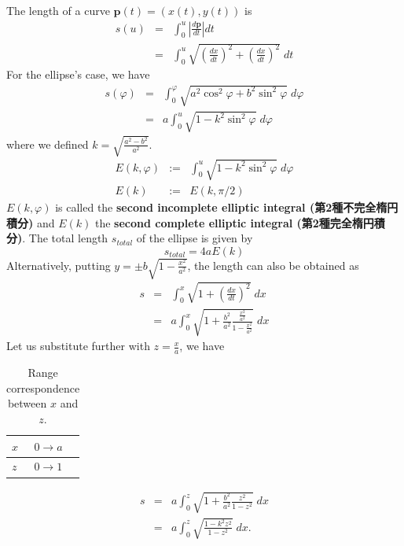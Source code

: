 \documentclass{article}
\begin{document}
The length of a curve $\mathbf{p}(t) = (x(t), y(t))$ is
\begin{eqnarray}
s(u) &=& \int_{0}^{u} \left| \frac{d \mathbf{p}}{d t} \right| dt  \\ \nonumber
     &=& \int_{0}^{u} \sqrt{ \left( \frac{d x}{d t} \right)^{2} +  \left( \frac{d x}{d t} \right)^{2} } \; dt
\end{eqnarray}
For the ellipse's case, we have
\begin{eqnarray}
s(\varphi) &=& \int_{0}^{\varphi} \sqrt{ a^{2} \cos^{2}{\varphi} +  b^{2}  \sin^{2}{\varphi}} \; d\varphi \\ \nonumber
     &=& a \int_{0}^{u} \sqrt{ 1 -  k^{2}  \sin^{2}{\varphi}} \; d\varphi 
\end{eqnarray}
where we defined $k = \sqrt{\frac{a^2 - b^2}{a^2}}$.
\begin{eqnarray}
E(k, \varphi ) &:=& \int_{0}^{u} \sqrt{ 1 -  k^{2}  \sin^{2}{\varphi}} \; d\varphi \\
E(k) &:=& E(k,  \pi/2 )
\end{eqnarray}
$E(k, \varphi )$ is called the \textbf{second incomplete elliptic integral (第2種不完全楕円積分)} and $E(k)$ the \textbf{second complete elliptic integral (第2種完全楕円積分)}. The total length $s_{total}$ of the ellipse is given by 
\begin{equation}
s_{total} = 4a E(k) 
\end{equation}
Alternatively, putting $y = \pm b \sqrt{1 - \frac{x^{2}}{a^{2}}}$, the length can also be obtained as
\begin{eqnarray}
s &=& \int_{0}^{x} \sqrt{ 1  +  \left( \frac{d x}{d t} \right)^{2} } \; dx \\ \nonumber
     &=& a \int_{0}^{x} \sqrt{ 1  +   \frac{b^{2}}{a^{2}} \frac{\frac{x^{2}}{a^{2}}}{1 - \frac{x^{2}}{a^{2}}} } \; dx
\end{eqnarray}
Let us substitute further with $z = \frac{x}{a}$, we have
\begin{table}[htb]
\caption{\label{table:x-z_range_correspondence}Range correspondence between $x$ and $z$.}
\centering
\begin{tabular}{ll}
$x$ & $0 \rightarrow a$\\
\hline
$z$ & $0 \rightarrow 1$\\
\end{tabular}
\end{table}

\begin{eqnarray}
s &=& a \int_{0}^{z} \sqrt{ 1  +   \frac{b^{2}}{a^{2}} \frac{z^{2}}{1 - z^{2}} } \; dx \\ \nonumber
  &=& a \int_{0}^{z} \sqrt{ \frac{1 -k ^{2} z^{2}}{1 - z^{2}} } \; dx.
  \end{eqnarray}
\end{document}
